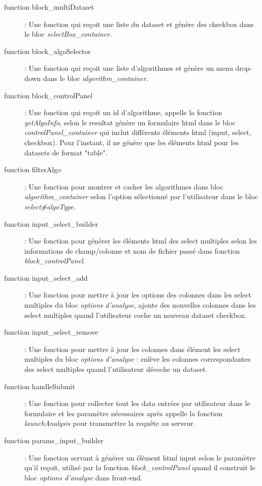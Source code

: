 \documentclass[a4paper]{report}
\begin{document}
\begin{description}
	\item[function block\_multiDataset]: Une fonction qui reçoit une liste du dataset et génère des checkbox dans le bloc \emph{selectBox\_container}.
	
	\item[function block\_algoSelector]: Une fonction qui reçoit une liste d'algorithmes et génère un menu drop-down dans le bloc \emph{algorithm\_container}.
	
	\item[function block\_controlPanel]: Une fonction qui reçoit un id d'algorithme, appelle la fonction \emph{getAlgoInfo}, selon le resultat génère un formulaire html dans le bloc \emph{controlPanel\_container} qui inclut différents éléments html (input, select, checkbox). Pour l'instant, il ne génère que les éléments html pour les datasets de format "table".  
	
	\item[function filterAlgo]: Une fonction pour montrer et cacher les algorithmes dans bloc \emph{algorithm\_container} selon l'option sélectionné par l'utilisateur dans le bloc \emph{select\#algoType}.
	
	\item[function input\_select\_builder]: Une fonction pour générer les éléments html des select multiples selon les informations de champ/colonne et nom de fichier passé dans fonction \emph{block\_controlPanel}.
	
	\item[function input\_select\_add]: Une fonction pour mettre à jour les options des colonnes dans les select multiples du bloc \emph{options d'analyse}, ajoute des nouvelles colonnes dans les select multiples quand l'utilisateur coche un nouveau dataset checkbox. 
	
	\item[function input\_select\_remove]: Une fonction pour mettre à jour les colonnes dans élément les select multiples du bloc \emph{options d'analyse} : enlève les colonnes correspondantes des select multiples quand l'utilisateur décoche un dataset.
	
	\item[function handleSubmit]: Une fonction pour collecter tout les data entrées par utilisateur dans le formulaire et les paramètre nécessaires après appelle la fonction \emph{launchAnalysis} pour transmettre la requête au serveur.
	
	\item[function params\_input\_builder]: Une fonction servant à générer un élément html input selon le paramètre qu'il reçoit, utilisé par la fonction \emph{block\_controlPanel} quand il construit le bloc \emph{options d'analyse} dans front-end.
	

\end{description}
\end{document}
